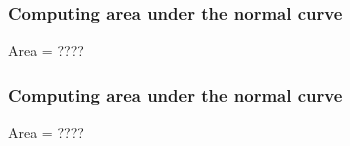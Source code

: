 \documentclass[handout]{beamer}
\begin{document}


   \begin{frame}
   \frametitle{Computing area under the normal curve}
   \begin{center}
   \end{center}
   Area = ????
   \end{frame}



   \begin{frame}
   \frametitle{Computing area under the normal curve}
   \begin{center}
   \end{center}
   Area = ????
   \end{frame}

\end{document}
